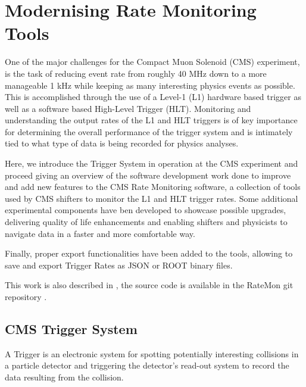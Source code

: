\chapter{Modernising Rate Monitoring Tools}

One of the major challenges for the Compact Muon Solenoid (CMS) experiment, is the task of reducing event rate from roughly 40 MHz down to a more manageable 1 kHz while keeping as many interesting physics events as possible. This is accomplished through the use of a Level-1 (L1) hardware based trigger as well as a software based High-Level Trigger (HLT). Monitoring and understanding the output rates of the L1 and HLT triggers is of key importance for determining the overall performance of the trigger system and is intimately tied to what type of data is being recorded for physics analyses.

Here, we introduce the Trigger System in operation at the CMS experiment and proceed giving an overview of the software development work done to improve and add new features to the CMS Rate Monitoring software, a collection of tools used by CMS shifters to monitor the L1 and HLT trigger rates. Some additional experimental components have ben developed to showcase possible upgrades, delivering quality of life enhancements and enabling shifters and physicists to navigate data in a faster and more comfortable way.

Finally, proper export functionalities have been added to the tools, allowing to save and export Trigger Rates as JSON or ROOT binary files.

This work is also described in \cite{VivaceRTM1} \cite{VivaceRTM2} \cite{L1TriggerOMSDevelopments} \cite{MohrmanRTM}, the source code is available in the RateMon git repository \cite{RateMonGit}.

\section{CMS Trigger System}

A Trigger is an  electronic system for spotting potentially interesting collisions in a particle detector and triggering the detector’s read-out system to record the data resulting from the collision.

